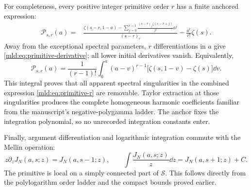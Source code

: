 For completeness, every positive integer primitive order $r$ has a finite anchored expression:
\begin{align}\label{mld:eq:primitive-r}
 \mathcal P_{s,r}(a)
  ={}&\frac{\displaystyle\zeta(s-r,1-a)
       -\sum_{j=0}^{r-1}\frac{(s-r)_j\zeta(s-r+j)}{j!}a^j}
                   {(s-r)_r}
        -\frac{a^r}{r!}\zeta(s).
\end{align}
Away from the exceptional spectral parameters, $r$ differentiations in $a$ give \eqref{mld:eq:primitive-derivative}; all lower initial derivatives vanish. Equivalently,
\[
 \mathcal P_{s,r}(a)=\frac1{(r-1)!}\int_0^a
       (a-v)^{r-1}\big[\zeta(s,1-v)-\zeta(s)\big]\dd v.
\]
This integral proves that all apparent spectral singularities in the combined expression \eqref{mld:eq:primitive-r} are removable. Taylor extraction at those singularities produces the complete homogeneous harmonic coefficients familiar from the manuscript's negative-polygamma ladder. The anchor fixes the integration polynomial, so no unrecorded integration constants enter.

Finally, argument differentiation and logarithmic integration commute with the Mellin operation:
\begin{equation}\label{mld:eq:argument-ladder}
 z\partial_z J_N(a,s;z)=J_N(a,s-1;z),\qquad
 \int \frac{J_N(a,s;z)}{z}\dd z=J_N(a,s+1;z)+C.
\end{equation}
The primitive is local on a simply connected part of $\mathcal S$. This follows directly from the polylogarithm order ladder and the compact bounds proved earlier.
